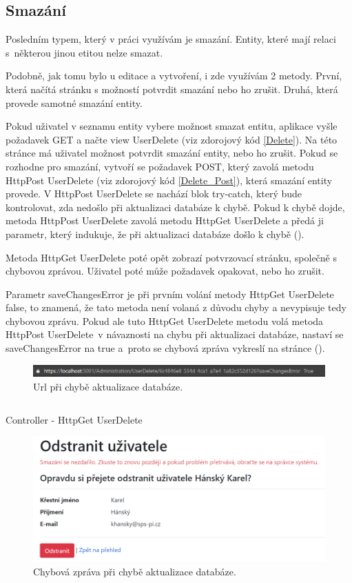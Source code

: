 \documentclass[a4paper, 12pt]{report}
\begin{document}
	\subsection{Smazání}
	Posledním typem, který v práci využívám je smazání. Entity, které mají relaci s~některou jinou etitou nelze smazat.\par
	Podobně, jak tomu bylo u editace a vytvoření, i zde využívám 2 metody. První, která načítá stránku s možností potvrdit smazání nebo ho zrušit. Druhá, která provede samotné smazání entity.\par
	Pokud uživatel v seznamu entity vybere možnost smazat entitu, aplikace vyšle požadavek GET a načte view UserDelete (viz zdorojový kód \ref{Delete}). Na této stránce má uživatel možnost potvrdit smazání entity, nebo ho zrušit. Pokud se rozhodne pro smazání, vytvoří se požadavek POST, který zavolá metodu HttpPost UserDelete (viz zdorojový kód \ref{Delete_Post}), která smazání entity provede. V HttpPost UserDelete se nachází blok try-catch, který bude kontrolovat, zda nedošlo při aktualizaci databáze k chybě. Pokud k chybě dojde, metoda HttpPost UserDelete zavolá metodu HttpGet UserDelete a předá ji parametr, který indukuje, že při aktualizaci databáze došlo k chybě ().\par
	Metoda HttpGet UserDelete poté opět zobrazí potvrzovací stránku, společně s chybovou zprávou. Uživatel poté může požadavek opakovat, nebo ho zrušit.\par
	Parametr saveChangesError je při prvním volání metody HttpGet UserDelete false, to znamená, že tato metoda není volaná z důvodu chyby a nevypisuje tedy chybovou zprávu. Pokud ale tuto HttpGet UserDelete metodu volá metoda HttpPost UserDelete~v návaznosti na chybu při aktualizaci databáze, nastaví se saveChangesError na true a~proto se chybová zpráva vykreslí na stránce ().
	\begin{figure}[h!]
		\includegraphics[width=\textwidth]{DeleteUser_lista}
		\caption{Url při chybě aktualizace databáze.}
		\label{DeleteUser_URL}
	\end{figure}
	\begin{listing}[H]
		\inputminted{csharp}{SourceCode/Controllers/Delete.cs}
		\caption{Controller - HttpGet UserDelete}
		\label{Delete}
	\end{listing}
	\begin{figure}[h!]
		\centering
		\includegraphics[scale=0.5]{DeleteUser}
		\caption{Chybová zpráva při chybě aktualizace databáze.}
		\label{DeleteUser_ErrorMessage}
	\end{figure}
\end{document}

